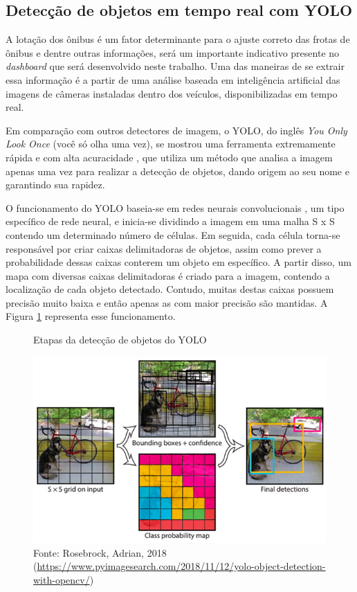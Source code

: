 \subsection{Detecção de objetos em tempo real com YOLO}

\indent
\par A lotação dos ônibus é um fator determinante para o ajuste correto das frotas de ônibus e dentre outras informações, será um importante indicativo presente no \textit{dashboard} que será desenvolvido neste trabalho. Uma das maneiras de se extrair essa informação é a partir de uma análise baseada em inteligência artificial das imagens de câmeras instaladas dentro dos veículos, disponibilizadas em tempo real.

\par Em comparação com outros detectores de imagem, o YOLO, do inglês \textit{You Only Look Once} (você só olha uma vez), se mostrou uma ferramenta extremamente rápida e com alta acuracidade \cite{RedmonJosephandFarhadi2018}, que utiliza um método que analisa a imagem apenas uma vez para realizar a detecção de objetos, dando origem ao seu nome e garantindo sua rapidez.

\par O funcionamento do YOLO baseia-se em redes neurais convolucionais \cite{RedmonJosephandFarhadi2018}, um tipo específico de rede neural, e inicia-se dividindo a imagem em uma malha S x S contendo um determinado número de células. Em seguida, cada célula torna-se responsável por criar caixas delimitadoras de objetos, assim como prever a probabilidade dessas caixas conterem um objeto em específico. A partir disso, um mapa com diversas caixas delimitadoras é criado para a imagem, contendo a localização de cada objeto detectado. Contudo, muitas destas caixas possuem precisão muito baixa e então apenas as com maior precisão são mantidas. A Figura \ref{funcyolo} representa esse funcionamento.

\begin{figure}[H]
    \centering
    \caption{Etapas da detecção de objetos do YOLO}
    \includegraphics[width=0.6\linewidth]{Imagens/yolo-design.jpg}
    \caption*{Fonte: Rosebrock, Adrian, 2018 (\url{https://www.pyimagesearch.com/2018/11/12/yolo-object-detection-with-opencv/})}
    \label{funcyolo}
\end{figure}

